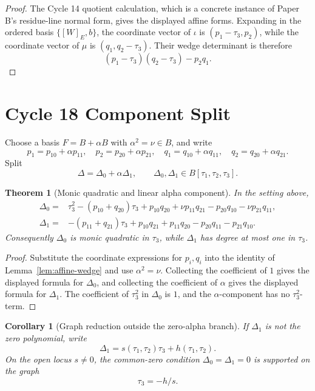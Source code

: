 \documentclass[11pt]{article}
\newtheorem{theorem}{Theorem}
\newtheorem{corollary}{Corollary}
\newcommand{\Deltaone}{\Delta_1}
\newcommand{\Deltazero}{\Delta_0}
\newcommand{\tauone}{\tau_1}
\newcommand{\tautwo}{\tau_2}
\newcommand{\tauthree}{\tau_3}
\begin{document}
\begin{proof}
The Cycle 14 quotient calculation, which is a concrete instance of Paper B's
residue-line normal form, gives the displayed affine forms.  Expanding in the
ordered basis \(\{[W]_E,b\}\), the coordinate vector of \(\iota\) is
\((p_1-\tauthree,p_2)\), while the coordinate vector of \(\mu\) is
\((q_1,q_2-\tauthree)\).  Their wedge determinant is therefore
\[
  (p_1-\tauthree)(q_2-\tauthree)-p_2q_1.
\]
\end{proof}

\section{Cycle 18 Component Split}

Choose a basis \(F=B+\alpha B\) with \(\alpha^2=\nu\in B\), and write
\[
  p_1=p_{10}+\alpha p_{11},\quad
  p_2=p_{20}+\alpha p_{21},\quad
  q_1=q_{10}+\alpha q_{11},\quad
  q_2=q_{20}+\alpha q_{21}.
\]
Split
\[
  \Delta=\Deltazero+\alpha\Deltaone,\qquad
  \Deltazero,\Deltaone\in B[\tauone,\tautwo,\tauthree].
\]

\begin{theorem}[Monic quadratic and linear alpha component]
\label{thm:component-split}
In the setting above,
\[
\begin{aligned}
\Deltazero={}&
  \tauthree^2-(p_{10}+q_{20})\tauthree
  +p_{10}q_{20}+\nu p_{11}q_{21}
  -p_{20}q_{10}-\nu p_{21}q_{11},\\
\Deltaone={}&
  -(p_{11}+q_{21})\tauthree
  +p_{10}q_{21}+p_{11}q_{20}-p_{20}q_{11}-p_{21}q_{10}.
\end{aligned}
\]
Consequently \(\Deltazero\) is monic quadratic in \(\tauthree\), while
\(\Deltaone\) has degree at most one in \(\tauthree\).
\end{theorem}

\begin{proof}
Substitute the coordinate expressions for \(p_i,q_i\) into the identity of
Lemma~\ref{lem:affine-wedge} and use \(\alpha^2=\nu\).  Collecting the
coefficient of \(1\) gives the displayed formula for \(\Deltazero\), and
collecting the coefficient of \(\alpha\) gives the displayed formula for
\(\Deltaone\).  The coefficient of \(\tauthree^2\) in \(\Deltazero\) is \(1\),
and the \(\alpha\)-component has no \(\tauthree^2\)-term.
\end{proof}

\begin{corollary}[Graph reduction outside the zero-alpha branch]
\label{cor:graph}
If \(\Deltaone\) is not the zero polynomial, write
\[
  \Deltaone=s(\tauone,\tautwo)\tauthree+h(\tauone,\tautwo).
\]
On the open locus \(s\ne0\), the common-zero condition
\(\Deltazero=\Deltaone=0\) is supported on the graph
\[
  \tauthree=-h/s.
\]
\end{corollary}
\end{document}
